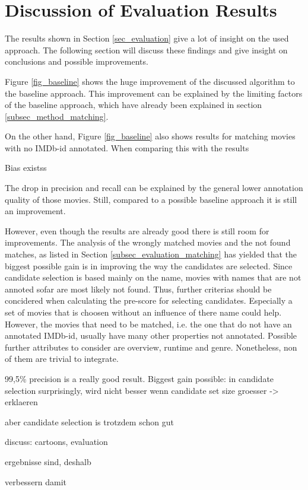 \section{Discussion of Evaluation Results}
\label{sec_discussion}

The results shown in Section \ref{sec_evaluation} give a lot of insight on the used approach.
The following section will discuss these findings and give insight on conclusions and possible improvements.

Figure \ref{fig_baseline} shows the huge improvement of the discussed algorithm to the baseline approach.
This improvement can be explained by the limiting factors of the baseline approach, which have already been explained in section \ref{subsec_method_matching}.

On the other hand, Figure \ref{fig_baseline} also shows results for matching movies with no IMDb-id annotated.
When comparing this with the results 


Bias existss

The drop in precision and recall can be explained by the general lower annotation quality of those movies.
Still, compared to a possible baseline approach it is still an improvement.

However, even though the results are already good there is still room for improvements.
The analysis of the wrongly matched movies and the not found matches, as listed in Section \ref{subsec_evaluation_matching} has yielded that the biggest possible gain is in improving the way the candidates are selected.
Since candidate selection is based mainly on the name, movies with names that are not annoted sofar are most likely not found.
Thus, further criterias should be concidered when calculating the pre-score for selecting candidates.
Especially a set of movies that is choosen without an influence of there name could help.
However, the movies that need to be matched, i.e. the one that do not have an annotated IMDb-id, usually have many other properties not annotated.
Possible further attributes to consider are overview, runtime and genre.
Nonetheless, non of them are trivial to integrate.

99,5\% precision is a really good result.
Biggest gain possible: in candidate selection
surprisingly, wird nicht besser wenn candidate set size groesser -> erklaeren

aber candidate selection is trotzdem schon gut

discuss: cartoons, evaluation

ergebnisse sind, deshalb

verbessern damit

